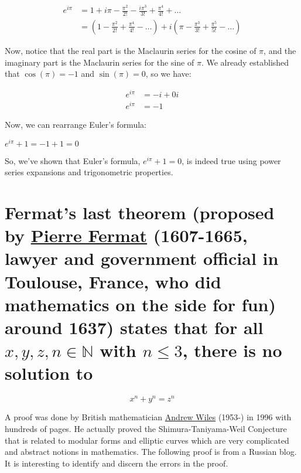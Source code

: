 \documentclass{article}
\begin{document}
\begin{equation*}
  \begin{aligned}
    e^{i\pi} &= 1 + i\pi - \frac{\pi^2}{2!}  - \frac{i\pi^3}{3!} + \frac{\pi^4}{4!}  + \ldots \\
    &= (1 - \frac{\pi^2}{2!} + \frac{\pi^4}{4!} - \ldots)  + i(\pi - \frac{\pi^3}{3!} + \frac{\pi^5}{5!} - \ldots)
  \end{aligned}
\end{equation*}

Now, notice that the real part is the Maclaurin series for the cosine of $\pi$, and the imaginary part is the Maclaurin series for the sine of $\pi$. We already established that $\cos(\pi) = -1$ and $\sin(\pi) = 0$, so we have:

\begin{equation*}
  \begin{aligned}
    e^{i\pi} &= -i + 0i \\
    e^{i\pi} &= -1    
  \end{aligned}
\end{equation*}

Now, we can rearrange Euler's formula:

$e^{i\pi} + 1 = -1 + 1 = 0$

So, we've shown that Euler's formula, $e^{i\pi} + 1 = 0$, is indeed true using power series expansions and trigonometric properties.

\section{Fermat's last theorem (proposed by \href{https://en.wikipedia.org/wiki/Pierre_de_Fermat}{Pierre Fermat} (1607-1665, lawyer and government oﬀicial in Toulouse, France, who did mathematics on the side for fun) around 1637) states that for all $x, y, z, n \in \mathbb{N} $ with $n \leq 3$, there is no solution to}

\begin{equation*}
  x^n + y^n = z^n
\end{equation*}

A proof was done by British mathematician \href{https://en.wikipedia.org/wiki/Andrew_Wiles}{Andrew Wiles} (1953-) in 1996 with hundreds of pages. He actually proved the Shimura-Taniyama-Weil Conjecture that is related to modular forms and elliptic curves which are very complicated and abstract notions in mathematics. The following proof is from a Russian blog. It is interesting to identify and discern the errors in the proof.
\end{document}
